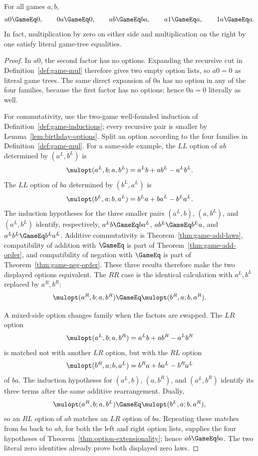 \begin{theorem}
  \label{thm:game-mul-laws}
  \leanok
  For all games \(a,b\),
  \[
    a0\GameEq0,\qquad 0a\GameEq0,\qquad ab\GameEq ba,
    \qquad a1\GameEq a,\qquad 1a\GameEq a.
  \]
  In fact, multiplication by zero on either side and multiplication on the right by one
  satisfy literal game-tree equalities.
\end{theorem}
\begin{proof}
  \leanok
  In \(a0\), the second factor has no options.  Expanding the recursive cut in
  Definition~\ref{def:game-mul} therefore gives two empty option lists, so
  \(a0=0\) as literal game trees.
  The same direct expansion of \(0a\) has no option in any of the four
  families, because the first factor has no options; hence \(0a=0\) literally
  as well.

  For commutativity, use the two-game well-founded induction of
  Definition~\ref{def:game-inductions}; every recursive pair is smaller by
  Lemma~\ref{lem:birthday-options}.  Split an option according to the four
  families in Definition~\ref{def:game-mul}.  For a same-side example, the
  \(LL\) option of
  \(ab\) determined by \((a^L,b^L)\) is
  \[
    \mulopt(a^L,b;a,b^L)=a^Lb+ab^L-a^Lb^L.
  \]
  The \(LL\) option of \(ba\) determined by \((b^L,a^L)\) is
  \[
    \mulopt(b^L,a;b,a^L)=b^La+ba^L-b^La^L.
  \]
  The induction hypotheses for the three smaller pairs
  \((a^L,b)\), \((a,b^L)\), and \((a^L,b^L)\) identify, respectively,
  \(a^Lb\GameEq ba^L\), \(ab^L\GameEq b^La\), and
  \(a^Lb^L\GameEq b^La^L\).  Additive commutativity is
  Theorem~\ref{thm:game-add-laws}, compatibility of addition with
  \(\GameEq\) is part of Theorem~\ref{thm:game-add-order}, and compatibility
  of negation with \(\GameEq\) is part of
  Theorem~\ref{thm:game-neg-order}.  These three results therefore make the
  two displayed options equivalent.  The \(RR\) case is the identical
  calculation with
  \(a^L,b^L\) replaced by \(a^R,b^R\):
  \[
    \mulopt(a^R,b;a,b^R)\GameEq\mulopt(b^R,a;b,a^R).
  \]

  A mixed-side option changes family when the factors are swapped.  The
  \(LR\) option
  \[
    \mulopt(a^L,b;a,b^R)=a^Lb+ab^R-a^Lb^R
  \]
  is matched not with another \(LR\) option, but with the \(RL\) option
  \[
    \mulopt(b^R,a;b,a^L)=b^Ra+ba^L-b^Ra^L
  \]
  of \(ba\).  The induction hypotheses for \((a^L,b)\), \((a,b^R)\), and
  \((a^L,b^R)\) identify its three terms after the same additive
  rearrangement.  Dually,
  \[
    \mulopt(a^R,b;a,b^L)\GameEq\mulopt(b^L,a;b,a^R),
  \]
  so an \(RL\) option of \(ab\) matches an \(LR\) option of \(ba\).
  Repeating these matches from \(ba\) back to \(ab\), for both the left and
  right option lists, supplies the four hypotheses of
  Theorem~\ref{thm:option-extensionality}; hence \(ab\GameEq ba\).  The two
  literal zero identities already prove both displayed zero laws.


\end{proof}
